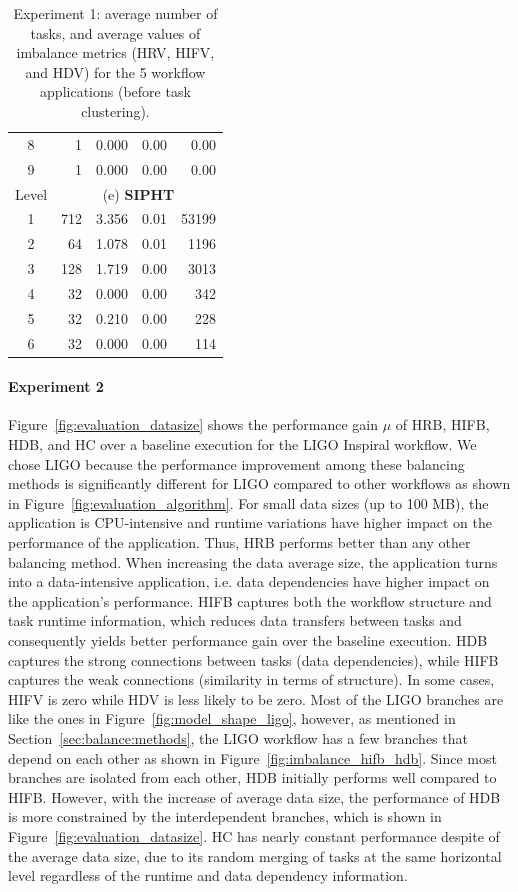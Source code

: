 \begin{table}[!htb]
\begin{tabular}{c|r|r|r|r}
		8 &1 & 0.000 & 0.00 & 0.00 \\
		9 & 1 & 0.000 & 0.00 & 0.00 \\
		\hline		
		Level & \multicolumn{4}{c}{(e) \textbf{SIPHT}} \\
		\hline
		1 & 712 & 3.356 & 0.01 & 53199 \\
		2 & 64 & 1.078 & 0.01 & 1196 \\
		3 & 128 & 1.719 & 0.00 & 3013 \\
		4 & 32 & 0.000 & 0.00 & 342 \\
		5 & 32 & 0.210 & 0.00 & 228\\
		6& 32 & 0.000 & 0.00 & 114\\
	\end{tabular}
	\caption{Experiment 1: average number of tasks, and average values of imbalance metrics (HRV, HIFV, and HDV) for the 5 workflow applications (before task clustering).}
	\label{tab:evaluation_montage}
\end{table} 


\paragraph{\textbf{Experiment 2}} 
Figure~\ref{fig:evaluation_datasize} shows the performance gain $\mu$ of HRB, HIFB, HDB, and HC over a baseline execution for the LIGO Inspiral workflow. We chose LIGO because the performance improvement among these balancing methods is significantly different for LIGO compared to other workflows as shown in Figure~\ref{fig:evaluation_algorithm}. For small data sizes (up to 100 MB), the application is CPU-intensive and runtime variations have higher impact on the performance of the application. Thus, HRB performs better than any other balancing method. When increasing the data average size, the application turns into a data-intensive application, i.e. data dependencies have higher impact on the application's performance. HIFB captures both the workflow structure and task runtime information, which reduces data transfers between tasks and consequently yields better performance gain over the baseline execution. HDB captures the strong connections between tasks (data dependencies), while HIFB captures the weak connections (similarity in terms of structure). In some cases, HIFV is zero while HDV is less likely to be zero.
Most of the LIGO branches are like the ones in Figure~\ref{fig:model_shape_ligo}, however, as mentioned in Section~\ref{sec:balance:methods}, the LIGO workflow has a few branches that depend on each other as shown in Figure~\ref{fig:imbalance_hifb_hdb}. Since most branches are isolated from each other, HDB initially performs well compared to HIFB. However, with the increase of average data size, the performance of HDB is more constrained by the interdependent branches, which is shown in Figure~\ref{fig:evaluation_datasize}.  
HC has nearly constant performance despite of the average data size, due to its random merging of tasks at the same horizontal level regardless of the runtime and data dependency information.


